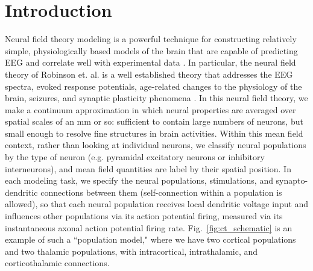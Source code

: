 \documentclass[preprint,review,10pt,authoryear,letterpaper]{elsarticle}
\begin{document}
\linenumbers

\section{Introduction}
\label{sec:introduction}
Neural field theory modeling is a powerful technique for constructing relatively simple, physiologically based models of the brain that are capable of predicting EEG and correlate well with experimental data \cite{Deco2008,Pinotsis2012}. In particular, the neural field theory of Robinson et. al. is a well established theory that addresses the EEG spectra, evoked response potentials, age-related changes to the physiology of the brain, seizures, and synaptic plasticity phenomena \citep{Robinson2005,Rowe2004413,PhysRevE.63.021903,PhysRevE.65.041924,Robinson:04aa,PhysRevE.68.021922,PhysRevE.70.011911,VanAlbada2010,Rennie2002,ker11,Breakspear2006}. In this neural field theory, we make a continuum approximation in which neural properties are averaged over spatial scales of an mm or so: sufficient to contain large numbers of neurons, but small enough to resolve fine structures in brain activities. Within this mean field context, rather than looking at individual neurons, we classify neural populations by the type of neuron (e.g. pyramidal excitatory neurons or inhibitory interneurons), and mean field quantities are label by their spatial position. In each modeling task, we specify the neural populations, stimulations, and synapto-dendritic connections between them (self-connection within a population is allowed), so that each neural population receives local dendritic voltage input and influences other populations via its action potential firing, measured via its instantaneous axonal action potential firing rate. Fig.~\ref{fig:ct_schematic} is an example of such a ``population model," where we have two cortical populations and two thalamic populations, with intracortical, intrathalamic, and corticothalamic connections.
\end{document}
